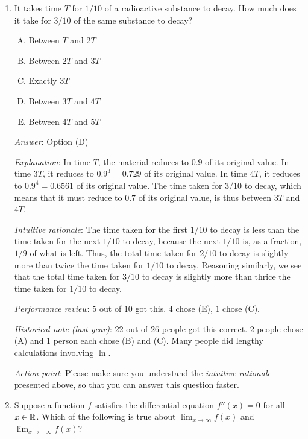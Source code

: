 \documentclass[10pt]{amsart}
\begin{document}
\begin{enumerate}
\item It takes time $T$ for $1/10$ of a radioactive substance to
  decay. How much does it take for $3/10$ of the same substance to
  decay?
  
  \begin{enumerate}[(A)]
  \item Between $T$ and $2T$
  \item Between $2T$ and $3T$
  \item Exactly $3T$
  \item Between $3T$ and $4T$
  \item Between $4T$ and $5T$
  \end{enumerate}

  {\em Answer}: Option (D)

  {\em Explanation}: In time $T$, the material reduces to $0.9$ of its
  original value. In time $3T$, it reduces to $0.9^3 = 0.729$ of its
  original value. In time $4T$, it reduces to $0.9^4 = 0.6561$ of its
  original value. The time taken for $3/10$ to decay, which means that
  it must reduce to $0.7$ of its original value, is thus between $3T$
  and $4T$.

  {\em Intuitive rationale}: The time taken for
  the first $1/10$ to decay is less than the time taken for the next
  $1/10$ to decay, because the next $1/10$ is, as a fraction, $1/9$ of
  what is left. Thus, the total time taken for $2/10$ to decay is
  slightly more than twice the time taken for $1/10$ to
  decay. Reasoning similarly, we see that the total time taken for
  $3/10$ to decay is slightly more than thrice the time taken for
  $1/10$ to decay.

  {\em Performance review}: $5$ out of $10$ got this. $4$ chose (E),
  $1$ chose (C).

  {\em Historical note (last year)}: $22$ out of $26$ people got this
  correct. $2$ people chose (A) and $1$ person each chose (B) and
  (C). Many people did lengthy calculations involving $\ln$.

  {\em Action point}: Please make sure you understand the {\em
  intuitive rationale} presented above, so that you can answer this
  question faster.

\item Suppose a function $f$ satisfies the differential equation
  $f''(x) = 0$ for all $x \in \mathbb{R}$. Which of the following is true
  about $\lim_{x \to \infty} f(x)$ and $\lim_{x \to -\infty} f(x)$?


\end{enumerate}
\end{document}
